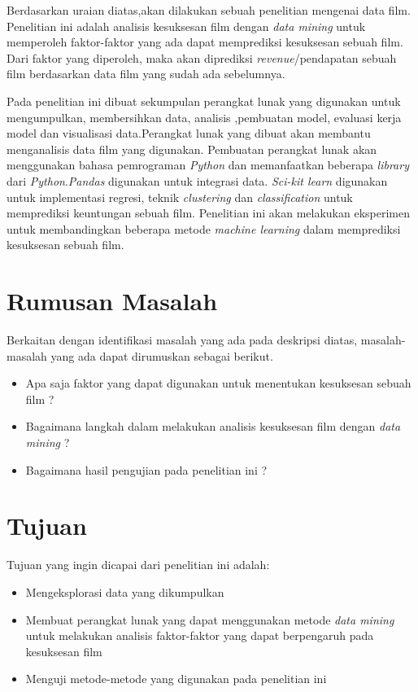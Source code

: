 Berdasarkan uraian diatas,akan dilakukan sebuah penelitian mengenai data film. Penelitian ini adalah analisis kesuksesan film dengan \textit{data mining} untuk memperoleh faktor-faktor yang ada dapat memprediksi  kesuksesan sebuah film. Dari faktor yang diperoleh, maka akan diprediksi \textit{revenue}/pendapatan sebuah film berdasarkan data film yang sudah ada sebelumnya. 
	
Pada penelitian ini dibuat sekumpulan perangkat lunak yang digunakan untuk mengumpulkan, membersihkan data, analisis ,pembuatan model, evaluasi kerja model dan visualisasi data.Perangkat lunak yang dibuat akan membantu menganalisis data film yang digunakan. Pembuatan perangkat lunak akan menggunakan bahasa pemrograman \textit{Python} dan memanfaatkan beberapa \textit{library} dari \textit{Python}.\textit{Pandas} digunakan untuk integrasi data. \textit{Sci-kit learn} digunakan untuk implementasi regresi, teknik \textit{clustering} dan \textit{classification} untuk memprediksi keuntungan sebuah film. Penelitian ini akan melakukan eksperimen untuk membandingkan beberapa metode \textit{machine learning} dalam memprediksi kesuksesan sebuah film.


\section{Rumusan Masalah}
\label{sec:rumusan}
Berkaitan dengan identifikasi masalah yang ada pada deskripsi diatas, masalah-masalah yang ada dapat dirumuskan sebagai berikut. 

\begin{itemize}
\item Apa saja faktor yang dapat digunakan untuk menentukan kesuksesan sebuah film ?
\item Bagaimana langkah dalam melakukan analisis kesuksesan film dengan \textit{data mining} ? 
\item Bagaimana hasil pengujian pada penelitian ini ?
\end{itemize}


\section{Tujuan}
\label{sec:tujuan}
Tujuan yang ingin dicapai dari penelitian ini adalah:  

\begin{itemize}
\item Mengeksplorasi data yang dikumpulkan
\item Membuat perangkat lunak yang dapat menggunakan metode \textit{data mining} untuk melakukan analisis faktor-faktor yang dapat berpengaruh pada kesuksesan film
\item Menguji metode-metode yang digunakan pada penelitian ini
\end{itemize} 

